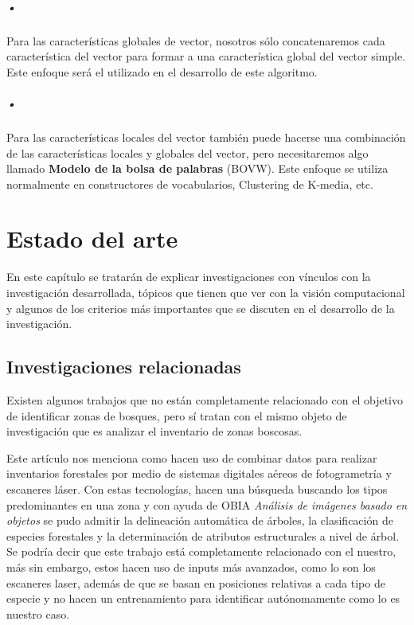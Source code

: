 \paragraph{•} Para las características globales de vector, nosotros sólo concatenaremos cada característica del vector para formar a una característica global del vector simple. Este enfoque será el utilizado en el desarrollo de este algoritmo.

\paragraph{•} Para las características locales del vector también puede hacerse una combinación de las características locales y globales del vector, pero necesitaremos algo llamado \textbf{Modelo de la bolsa de palabras} (BOVW). Este enfoque se utiliza normalmente en constructores de vocabularios, Clustering de K-media, etc.

\chapter{Estado del arte}
En este capítulo se tratarán de explicar investigaciones con vínculos con la investigación desarrollada, tópicos que tienen que ver con la visión computacional y algunos de los criterios más importantes que se discuten en el desarrollo de la investigación.


\section{Investigaciones relacionadas}
Existen algunos trabajos que no están completamente relacionado con el objetivo de identificar zonas de bosques, pero sí tratan con el mismo objeto de investigación que es analizar el inventario de zonas boscosas.


\cite{rf1} Este artículo nos menciona como hacen uso de combinar datos para realizar inventarios forestales por medio de sistemas digitales aéreos de fotogrametría y escaneres láser. Con estas tecnologías, hacen una búsqueda buscando los tipos predominantes en una zona y con ayuda de OBIA \textit{Análisis de imágenes basado en objetos} se pudo admitir la delineación automática de árboles, la clasificación de especies forestales y la determinación de atributos estructurales a nivel de árbol. Se podría decir que este trabajo está completamente relacionado con el nuestro, más sin embargo, estos hacen uso de inputs más avanzados, como lo  son los escaneres laser, además de que se basan en posiciones relativas a cada tipo de especie y no hacen un entrenamiento para identificar autónomamente como lo es nuestro caso.
 
